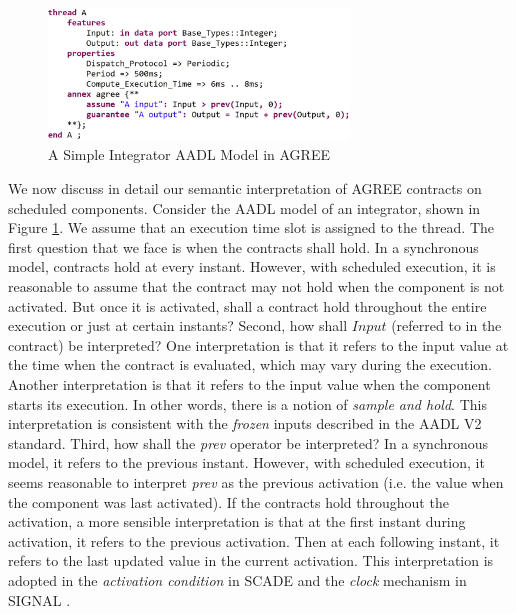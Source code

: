 \begin{figure}[t!]
\centering
\includegraphics[width=80mm]{pre.jpg}
\caption{A Simple Integrator AADL Model in AGREE\label{integratorFig}}
\end{figure}

We now discuss in detail our semantic interpretation of AGREE contracts on scheduled components.
Consider the AADL model of an integrator, shown in Figure \ref{integratorFig}. We assume that an execution time slot is assigned to the thread.  
The first question that we face is when the contracts shall hold. In a synchronous model, contracts hold at every instant. However, with scheduled execution, it is reasonable to assume that the contract may not hold when the component is not activated. But once it is activated, shall a contract hold throughout the entire execution or just at certain instants? Second, how shall $Input$ (referred to in the contract) be interpreted? One interpretation is that it refers to the input value at the time when the contract is evaluated, which may vary during the execution. Another interpretation is that it refers to the input value when the component starts its execution. In other words, there is a notion of \emph{sample and hold}. This interpretation is consistent with the \emph{frozen} inputs described in the AADL V2 standard. Third, how shall the \emph{prev} operator be interpreted? In a synchronous model, it refers to the previous instant. However, with scheduled execution, it seems reasonable to interpret \emph{prev} as the previous activation (i.e. the value when the component was last activated). If the contracts hold throughout the activation, a more sensible interpretation is that at the first instant during activation, it refers to the previous activation. Then at each following instant, it refers to the last updated value in the current activation. This interpretation is adopted in the \emph{activation condition} in SCADE \cite{scade} and the \emph{clock} mechanism in SIGNAL \cite{signal}.

